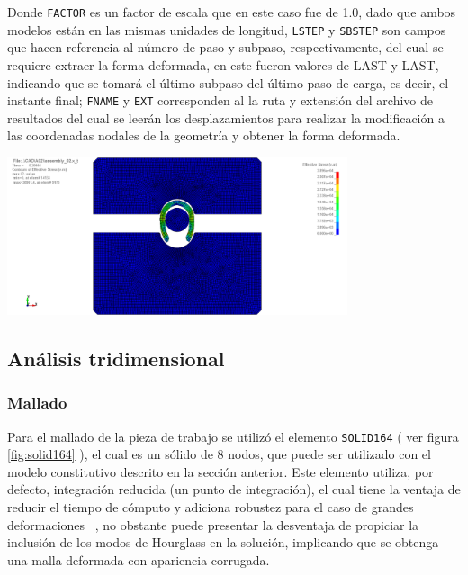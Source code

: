 Donde \texttt{FACTOR} es un factor de escala que en este caso fue de 1.0, dado que ambos modelos están en 
las mismas unidades de longitud, \texttt{LSTEP} y \texttt{SBSTEP} son campos que hacen referencia al número 
de paso y subpaso, respectivamente, del cual se requiere extraer la forma deformada, en este fueron valores 
de LAST y LAST, indicando que se tomará el último subpaso del último paso de carga, es decir, el instante 
final; \texttt{FNAME} y \texttt{EXT} corresponden al la ruta y extensión del archivo de resultados del cual 
se leerán los desplazamientos para realizar la modificación a las coordenadas nodales de la geometría y 
obtener la forma deformada.\\


\begin{center}
\includegraphics[width=0.75\textwidth]{src/ch3/initial_stress.png}
\label{fig:initial_stress}
\end{center}



\subsection{Análisis tridimensional}

\subsubsection{Mallado}

Para el mallado de la pieza de trabajo se utilizó el elemento \texttt{SOLID164} 
( ver figura \ref{fig:solid164} ), el cual es un sólido de 8 nodos, que puede ser utilizado con el modelo 
constitutivo descrito en la sección anterior. Este elemento utiliza, por defecto, integración reducida 
(un punto de integración), el cual tiene la ventaja de reducir el tiempo de cómputo y adiciona 
robustez para el caso de grandes deformaciones ~\cite{lsdyna-ansys-manual}, no obstante puede presentar 
la desventaja de propiciar la inclusión de los modos de Hourglass en la solución, implicando que 
se obtenga una malla deformada con apariencia corrugada.

